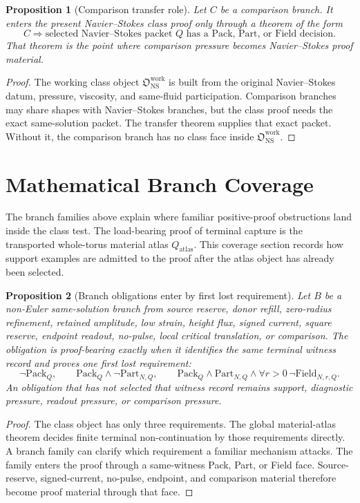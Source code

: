 \documentclass[11pt]{article}
\newtheorem{proposition}{Proposition}
\newcommand{\NS}{\mathrm{NS}}
\newcommand{\Pack}{\mathrm{Pack}}
\newcommand{\Part}{\mathrm{Part}}
\newcommand{\Field}{\mathrm{Field}}
\newcommand{\Owork}{\mathfrak O_{\NS}^{\mathrm{work}}}
\begin{document}
\begin{proposition}[Comparison transfer role]
Let \(C\) be a comparison branch.
It enters the present Navier--Stokes class proof only through a theorem of the form
\[
  C\Longrightarrow
  \text{selected Navier--Stokes packet }Q
  \text{ has a Pack, Part, or Field decision}.
\]
That theorem is the point where comparison pressure becomes Navier--Stokes proof material.
\end{proposition}

\begin{proof}
The working class object \(\Owork\) is built from the original Navier--Stokes datum, pressure, viscosity, and same-fluid participation.
Comparison branches may share shapes with Navier--Stokes branches, but the class proof needs the exact same-solution packet.
The transfer theorem supplies that exact packet.
Without it, the comparison branch has no class face inside \(\Owork\).
\end{proof}


\section{Mathematical Branch Coverage}

The branch families above explain where familiar positive-proof obstructions land inside the class test.
The load-bearing proof of terminal capture is the transported whole-torus material atlas \(Q_{\mathrm{atlas}}\).
This coverage section records how support examples are admitted to the proof after the atlas object has already been selected.

\begin{proposition}[Branch obligations enter by first lost requirement]
Let \(B\) be a non-Euler same-solution branch from source reserve, donor refill, zero-radius refinement, retained amplitude, low strain, height flux, signed current, square reserve, endpoint readout, no-pulse, local critical translation, or comparison.
The obligation is proof-bearing exactly when it identifies the same terminal witness record and proves one first lost requirement:
\[
  \neg\Pack_Q,\qquad
  \Pack_Q\wedge\neg\Part_{N,Q},\qquad
  \Pack_Q\wedge\Part_{N,Q}\wedge\forall r>0\,\neg\Field_{N,r,Q}.
\]
An obligation that has not selected that witness record remains support, diagnostic pressure, readout pressure, or comparison pressure.
\end{proposition}

\begin{proof}
The class object has only three requirements.
The global material-atlas theorem decides finite terminal non-continuation by those requirements directly.
A branch family can clarify which requirement a familiar mechanism attacks.
The family enters the proof through a same-witness Pack, Part, or Field face.
Source-reserve, signed-current, no-pulse, endpoint, and comparison material therefore become proof material through that face.
\end{proof}
\end{document}
